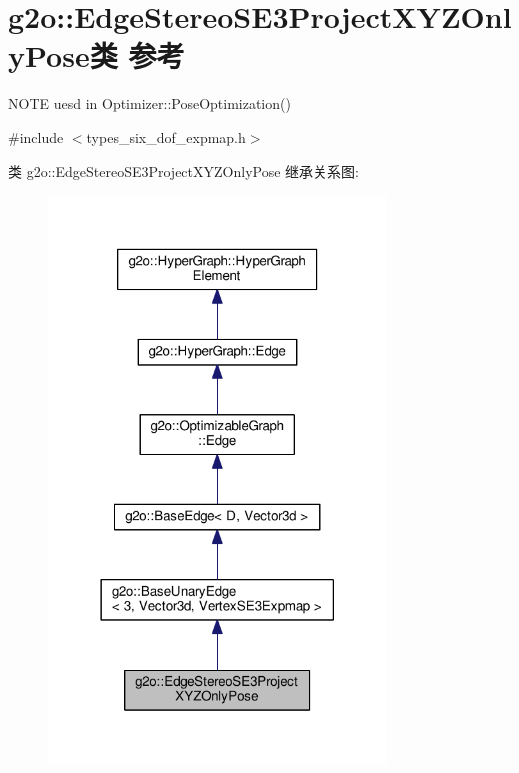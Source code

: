 \hypertarget{classg2o_1_1EdgeStereoSE3ProjectXYZOnlyPose}{\section{g2o\-:\-:Edge\-Stereo\-S\-E3\-Project\-X\-Y\-Z\-Only\-Pose类 参考}
\label{classg2o_1_1EdgeStereoSE3ProjectXYZOnlyPose}
}


N\-O\-T\-E uesd in Optimizer\-::\-Pose\-Optimization()  




{\ttfamily \#include $<$types\-\_\-six\-\_\-dof\-\_\-expmap.\-h$>$}



类 g2o\-:\-:Edge\-Stereo\-S\-E3\-Project\-X\-Y\-Z\-Only\-Pose 继承关系图\-:
\nopagebreak
\begin{figure}[H]
\begin{center}
\leavevmode
\includegraphics[width=254pt]{classg2o_1_1EdgeStereoSE3ProjectXYZOnlyPose__inherit__graph}
\end{center}
\end{figure}


